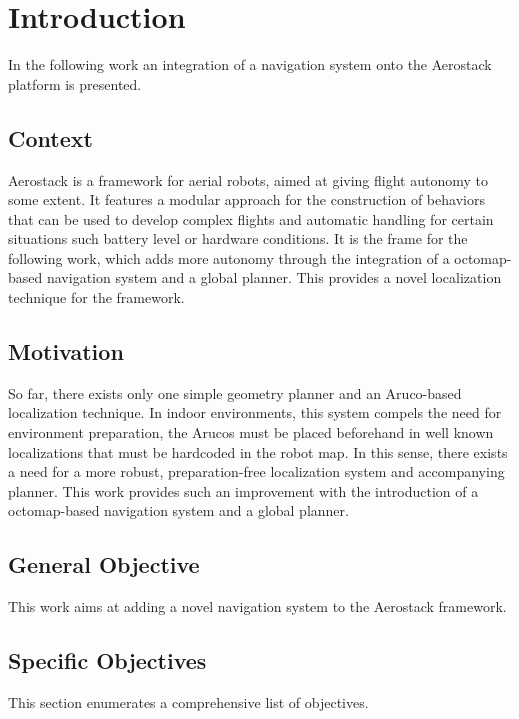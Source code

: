 \chapter{Introduction}

  In the following work an integration of a navigation system onto the Aerostack platform is presented.

  \section{Context}

    Aerostack is a framework for aerial robots, aimed at giving flight autonomy to some extent. It features a modular approach for the construction of behaviors that can be used to develop complex flights and automatic handling for certain situations such battery level or hardware conditions. It is the frame for the following work, which adds more autonomy through the integration of a octomap-based navigation system and a global planner. This provides a novel localization technique for the framework.

  \section{Motivation}

    So far, there exists only one simple geometry planner and an Aruco-based localization technique. In indoor environments, this system compels the need for environment preparation, the Arucos must be placed beforehand in well known localizations that must be hardcoded in the robot map. In this sense, there exists a need for a more robust, preparation-free localization system and accompanying planner. This work provides such an improvement with the introduction of a octomap-based navigation system and a global planner.

  \section{General Objective}

    This work aims at adding a novel navigation system to the Aerostack framework.


  \section{Specific Objectives}

    This section enumerates a comprehensive list of objectives.

